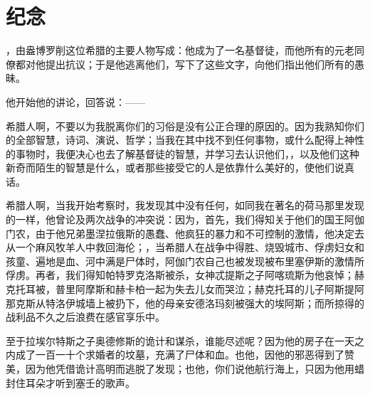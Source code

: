 
\chapter{纪念}


\par

，由盎博罗削这位希腊的主要人物写成：他成为了一名基督徒，而他所有的元老同僚都对他提出抗议；于是他逃离他们，写下了这些文字，向他们指出他们所有的愚昧。\par

他开始他的讲论，回答说：——\par

希腊人啊，不要以为我脱离你们的习俗是没有公正合理的原因的。因为我熟知你们的全部智慧，诗词、演说、哲学；当我在其中找不到任何事物，或什么配得上神性的事物时，我便决心也去了解基督徒的智慧，并学习去认识他们，，以及他们这种新奇而陌生的智慧是什么，或者那些接受它的人是依靠什么美好的，使他们说真话。\par

希腊人啊，当我开始考察时，我发现其中没有任何，如同我在著名的荷马那里发现的一样，他曾论及两次战争的冲突说：因为，首先，我们得知关于他们的国王阿伽门农，由于他兄弟墨涅拉俄斯的愚蠢、他疯狂的暴力和不可控制的激情，他决定去从一个麻风牧羊人中救回海伦；，当希腊人在战争中得胜、烧毁城市、俘虏妇女和孩童、遍地是血、河中满是尸体时，阿伽门农自己也被发现被布里塞伊斯的激情所俘虏。再者，我们得知帕特罗克洛斯被杀，女神忒提斯之子阿喀琉斯为他哀悼；赫克托耳被，普里阿摩斯和赫卡柏一起为失去儿女而哭泣；赫克托耳的儿子阿斯提阿那克斯从特洛伊城墙上被扔下，他的母亲安德洛玛刻被强大的埃阿斯；而所掠得的战利品不久之后浪费在感官享乐中。\par

至于拉埃尔特斯之子奥德修斯的诡计和谋杀，谁能尽述呢？因为他的房子在一天之内成了一百一十个求婚者的坟墓，充满了尸体和血。也他，因他的邪恶得到了赞美，因为他凭借诡计高明而逃脱了发现；也他，你们说他航行海上，只因为他用蜡封住耳朵才听到塞壬的歌声。\par

